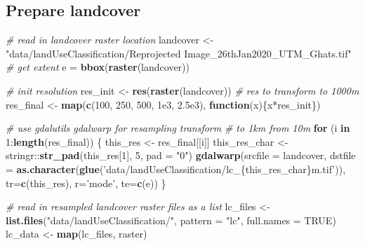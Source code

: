 \documentclass[]{article}
\newenvironment{Shaded}{}{}
\newcommand{\CommentTok}[1]{\textcolor[rgb]{0.38,0.63,0.69}{\textit{#1}}}
\newcommand{\ControlFlowTok}[1]{\textcolor[rgb]{0.00,0.44,0.13}{\textbf{#1}}}
\newcommand{\DataTypeTok}[1]{\textcolor[rgb]{0.56,0.13,0.00}{#1}}
\newcommand{\DecValTok}[1]{\textcolor[rgb]{0.25,0.63,0.44}{#1}}
\newcommand{\FloatTok}[1]{\textcolor[rgb]{0.25,0.63,0.44}{#1}}
\newcommand{\KeywordTok}[1]{\textcolor[rgb]{0.00,0.44,0.13}{\textbf{#1}}}
\newcommand{\NormalTok}[1]{#1}
\newcommand{\OperatorTok}[1]{\textcolor[rgb]{0.40,0.40,0.40}{#1}}
\newcommand{\OtherTok}[1]{\textcolor[rgb]{0.00,0.44,0.13}{#1}}
\newcommand{\StringTok}[1]{\textcolor[rgb]{0.25,0.44,0.63}{#1}}
\begin{document}
\hypertarget{prepare-landcover}{%
\subsection{Prepare landcover}\label{prepare-landcover}}

\begin{Shaded}
\begin{Highlighting}[]
\CommentTok{# read in landcover raster location}
\NormalTok{landcover <-}\StringTok{ "data/landUseClassification/Reprojected Image_26thJan2020_UTM_Ghats.tif"}
\CommentTok{# get extent}
\NormalTok{e =}\StringTok{ }\KeywordTok{bbox}\NormalTok{(}\KeywordTok{raster}\NormalTok{(landcover))}

\CommentTok{# init resolution}
\NormalTok{res_init <-}\StringTok{ }\KeywordTok{res}\NormalTok{(}\KeywordTok{raster}\NormalTok{(landcover))}
\CommentTok{# res to transform to 1000m}
\NormalTok{res_final <-}\StringTok{ }\KeywordTok{map}\NormalTok{(}\KeywordTok{c}\NormalTok{(}\DecValTok{100}\NormalTok{, }\DecValTok{250}\NormalTok{, }\DecValTok{500}\NormalTok{, }\FloatTok{1e3}\NormalTok{, }\FloatTok{2.5e3}\NormalTok{), }\ControlFlowTok{function}\NormalTok{(x)\{x}\OperatorTok{*}\NormalTok{res_init\})}

\CommentTok{# use gdalutils gdalwarp for resampling transform}
\CommentTok{# to 1km from 10m}
\ControlFlowTok{for}\NormalTok{ (i }\ControlFlowTok{in} \DecValTok{1}\OperatorTok{:}\KeywordTok{length}\NormalTok{(res_final)) \{}
\NormalTok{  this_res <-}\StringTok{ }\NormalTok{res_final[[i]]}
\NormalTok{  this_res_char <-}\StringTok{ }\NormalTok{stringr}\OperatorTok{::}\KeywordTok{str_pad}\NormalTok{(this_res[}\DecValTok{1}\NormalTok{], }\DecValTok{5}\NormalTok{, }\DataTypeTok{pad =} \StringTok{"0"}\NormalTok{)}
  \KeywordTok{gdalwarp}\NormalTok{(}\DataTypeTok{srcfile =}\NormalTok{ landcover, }
          \DataTypeTok{dstfile =} \KeywordTok{as.character}\NormalTok{(}\KeywordTok{glue}\NormalTok{(}\StringTok{'data/landUseClassification/lc_\{this_res_char\}m.tif'}\NormalTok{)), }
          \DataTypeTok{tr=}\KeywordTok{c}\NormalTok{(this_res), }\DataTypeTok{r=}\StringTok{'mode'}\NormalTok{, }\DataTypeTok{te=}\KeywordTok{c}\NormalTok{(e))}
\NormalTok{\}}
\end{Highlighting}
\end{Shaded}

\begin{Shaded}
\begin{Highlighting}[]
\CommentTok{# read in resampled landcover raster files as a list}
\NormalTok{lc_files <-}\StringTok{ }\KeywordTok{list.files}\NormalTok{(}\StringTok{"data/landUseClassification/"}\NormalTok{, }\DataTypeTok{pattern =} \StringTok{"lc"}\NormalTok{, }\DataTypeTok{full.names =} \OtherTok{TRUE}\NormalTok{)}
\NormalTok{lc_data <-}\StringTok{ }\KeywordTok{map}\NormalTok{(lc_files, raster)}
\end{Highlighting}
\end{Shaded}
\end{document}
